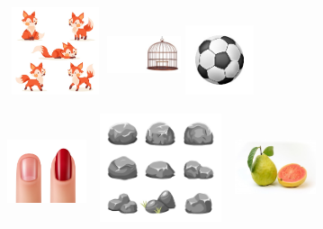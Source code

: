 


\begin{figure}[htpb!]
\includegraphics[width=1.10833in,height=1.00903in]{media/image52.jpeg}
\includegraphics[width=0.85556in,height=0.92222in]{media/image53.jpeg}
\includegraphics[width=0.79808in,height=0.79808in]{media/image54.jpeg}
\end{figure}




\begin{figure}[htpb!]
\includegraphics[width=0.91319in,height=1.16319in]{media/image55.jpeg}
\includegraphics[width=1.62569in,height=1.25000in]{media/image56.jpeg}
\includegraphics[width=0.93990in,height=1.27885in]{media/image57.jpeg}
\end{figure}

